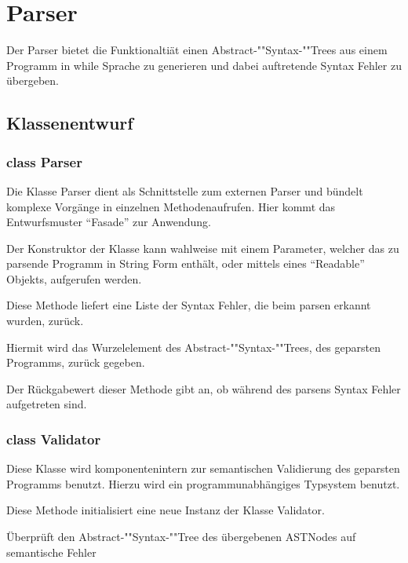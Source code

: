 \section{Parser}

Der Parser bietet die Funktionaltiät einen Abstract-""Syntax-""Trees aus einem Programm in while Sprache zu generieren und dabei auftretende Syntax Fehler zu übergeben.

\subsection{Klassenentwurf}

\subsubsection{class Parser}

Die Klasse Parser dient als Schnittstelle zum externen Parser und bündelt komplexe Vorgänge in einzelnen Methodenaufrufen. Hier kommt das Entwurfsmuster "`Fasade"' zur Anwendung.

\begin{description}
		Der Konstruktor der Klasse kann wahlweise mit einem Parameter, welcher das zu parsende Programm in String Form enthält, oder mittels eines "`Readable"' Objekts, aufgerufen werden.

		Diese Methode liefert eine Liste der Syntax Fehler, die beim parsen erkannt wurden, zurück.
  
		Hiermit wird das Wurzelelement des Abstract-""Syntax-""Trees, des geparsten Programms, zurück gegeben.

		Der Rückgabewert dieser Methode gibt an, ob während des parsens Syntax Fehler aufgetreten sind.
\end{description}

\subsubsection{class Validator}

Diese Klasse wird komponentenintern zur semantischen Validierung des geparsten Programms benutzt. Hierzu wird ein programmunabhängiges Typsystem benutzt.

\begin{description}
		Diese Methode initialisiert eine neue Instanz der Klasse Validator.

		Überprüft den Abstract-""Syntax-""Tree des übergebenen ASTNodes auf semantische Fehler
\end{description}

